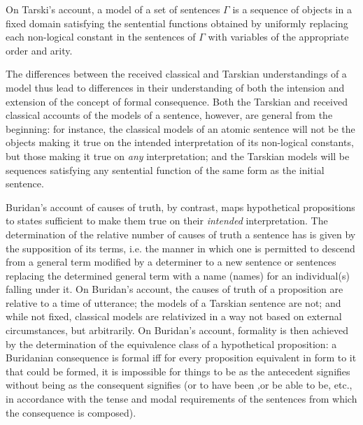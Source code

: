 \documentclass[]{article}
\begin{document}
On Tarski's account, a model of a set of sentences $\Gamma$ is a sequence of objects in a fixed domain satisfying the sentential functions obtained by uniformly replacing each non-logical constant in the sentences of $\Gamma$ with variables of the appropriate order and arity. 

The differences between the received classical and Tarskian understandings of a model thus lead to differences in their understanding of both the intension and extension of the concept of formal consequence. Both the Tarskian and received classical accounts of the models of a sentence, however, are general from the beginning: for instance, the classical models of an atomic sentence will not be the objects making it true on the intended interpretation of its non-logical constants, but those making it true on \textit{any} interpretation; and the Tarskian models will be sequences satisfying any sentential function of the same form as the initial sentence.

Buridan's account of causes of truth, by contrast, maps hypothetical propositions to states sufficient to make them true on their \textit{intended} interpretation. The determination of the relative number of causes of truth a sentence has is given by the supposition of its terms, i.e. the manner in which one is permitted to descend from a general term modified by a determiner to a new sentence or sentences replacing the determined general term with a name (names) for an individual(s) falling under it. On Buridan's account, the causes of truth of a proposition are relative to a time of utterance; the models of a Tarskian sentence are not; and while not fixed, classical models are relativized in a way not based on external circumstances, but arbitrarily. On Buridan's account, formality is then achieved by the determination of the equivalence class of a hypothetical proposition: a Buridanian consequence is formal iff for every proposition equivalent in form to it that could be formed, it is impossible for things to be as the antecedent signifies without being as the consequent signifies (or to have been ,or be able to be, etc., in accordance with the tense and modal requirements of the sentences from which the consequence is composed). 

\end{document}
